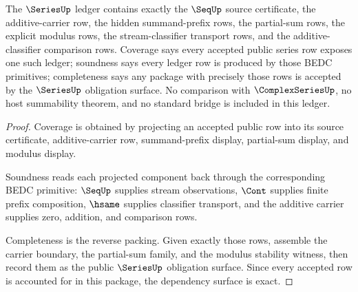 \begin{theorem}
\label{thm:series-ledger-exactness-obligation}
The $\SeriesUp$ ledger contains exactly the $\SeqUp$ source certificate, the additive-carrier row, the hidden summand-prefix rows, the partial-sum rows, the explicit modulus rows, the stream-classifier transport rows, and the additive-classifier comparison rows. Coverage says every accepted public series row exposes one such ledger; soundness says every ledger row is produced by those BEDC primitives; completeness says any package with precisely those rows is accepted by the $\SeriesUp$ obligation surface. No comparison with $\ComplexSeriesUp$, no host summability theorem, and no standard bridge is included in this ledger.
\end{theorem}
\begin{proof}
Coverage is obtained by projecting an accepted public row into its source certificate, additive-carrier row, summand-prefix display, partial-sum display, and modulus display.

Soundness reads each projected component back through the corresponding BEDC primitive: $\SeqUp$ supplies stream observations, $\Cont$ supplies finite prefix composition, $\hsame$ supplies classifier transport, and the additive carrier supplies zero, addition, and comparison rows.

Completeness is the reverse packing. Given exactly those rows, assemble the carrier boundary, the partial-sum family, and the modulus stability witness, then record them as the public $\SeriesUp$ obligation surface. Since every accepted row is accounted for in this package, the dependency surface is exact.
\end{proof}

